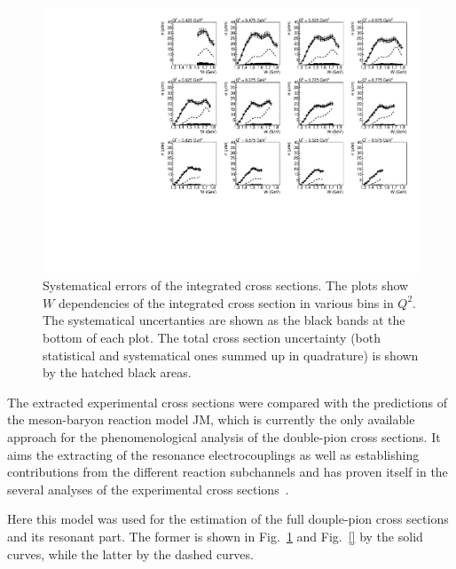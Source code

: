 \documentclass[prc,twocolumn,superscriptaddress,showpacs,amssymb,amsmath,amsfonts,linenumbers,aps]{revtex4-1}
\begin{document}
\begin{figure}[htp]
\begin{center}
\includegraphics[width=15cm]{pictures/sys_err/sys_err.pdf}
\caption{\small Systematical errors of the integrated cross sections. The plots show $W$ dependencies of the integrated cross section in various bins in $Q^{2}$. The systematical uncertanties are shown as the black bands at the bottom of each plot. The total cross section uncertainty (both statistical and systematical ones summed up in quadrature) is shown by the hatched black areas.}
\label{fig:sys_err}

\end{center}
\end{figure}

The extracted experimental cross sections were compared with the predictions of the meson-baryon reaction model JM, which is currently the only available approach for the phenomenological analysis of the double-pion cross sections. It aims the extracting of the resonance electrocouplings as well as
establishing contributions from the different reaction subchannels and has proven itself in the several analyses of the experimental cross sections~\cite{Mokeev:2008iw,Mokeev:2012vsa,Mokeev:2015lda}.

Here this model was used for the estimation of the full douple-pion cross sections and its resonant part. The former is shown in Fig.~\ref{fig:sys_err} and Fig.~\ref{} by the solid curves, while the latter by the dashed curves.
\end{document}
